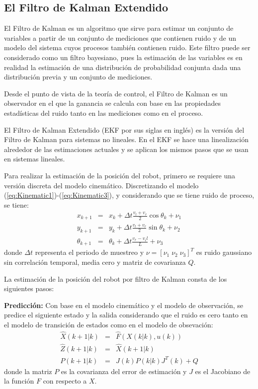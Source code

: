 \subsection{El Filtro de Kalman Extendido}
El Filtro de Kalman es un algoritmo que sirve para estimar un conjunto de variables a partir de un conjunto de mediciones que contienen ruido y de un modelo del sistema cuyos procesos también contienen ruido. Este filtro puede ser considerado como un filtro bayesiano, pues la estimación de las variables es en realidad la estimación de una distribución de probabilidad conjunta dada una distribución previa y un conjunto de mediciones. 

Desde el punto de vista de la teoría de control, el Filtro de Kalman es un observador en el que la ganancia se calcula con base en las propiedades estadísticas del ruido tanto en las mediciones como en el proceso. 

El Filtro de Kalman Extendido (EKF por sus siglas en inglés) es la versión del Filtro de Kalman para sistemas no lineales. En el EKF se hace una linealización alrededor de las estimaciones actuales y se aplican los mismos pasos que se usan en sistemas lineales. 

Para realizar la estimación de la posición del robot, primero se requiere una versión discreta del modelo cinemático. Discretizando el modelo (\ref{eq:Kinematic1})-(\ref{eq:Kinematic3}), y considerando que se tiene ruido de proceso, se tiene:
\begin{eqnarray}
x_{k+1} &=& x_k + \Delta t \frac{v_l + v_r}{2}\cos\theta_k + \nu_1\label{eq:Discrete1}\\
y_{k+1} &=& y_k + \Delta t \frac{v_l + v_r}{2}\sin\theta_k + \nu_2\\
\theta_{k+1} &=& \theta_k + \Delta t \frac{v_r - v_il}{L} + \nu_3\label{eq:Discrete3}
\end{eqnarray}
donde $\Delta t$ representa el periodo de muestreo y $\nu = \left[\nu_1\;\nu_2\;\nu_3\right]^T$ es ruido gaussiano sin correlación temporal, media cero y matriz de covarianza $Q$. 

La estimación de la posición del robot por filtro de Kalman consta de los siguientes pasos:

\textbf{Predicción:} Con base en el modelo cinemático y el modelo de observación, se predice el siguiente estado y la salida considerando que el ruido es cero tanto en el modelo de transición de estados como en el modelo de obsevación:
\begin{eqnarray*}
	\hat{X}(k+1|k) &=& \hat{F}(X(k|k), u(k))\\
	\hat{Z}(k+1|k) &=& \hat{X}(k+1|k)\\
	P(k+1|k) &=& J(k)P(k|k)J^T(k) + Q
\end{eqnarray*}
donde la matriz $P$ es la covarianza del error de estimación y $J$ es el Jacobiano de la función $F$ con respecto a $X$.

